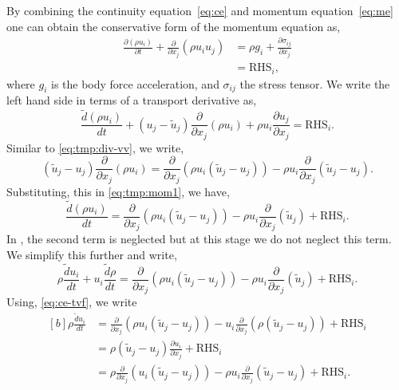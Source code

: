 \documentclass[preprint,12pt]{elsarticle}
\begin{document}
By combining the continuity equation~\eqref{eq:ce} and momentum
equation~\eqref{eq:me} one can obtain the conservative form of the momentum
equation as,
\begin{equation}
\begin{aligned}
  \label{eq:mom-eq-eulerian}
  \frac{\partial (\rho u_i)}{\partial t} +
  \frac{\partial} {\partial x_j} (\rho u_i u_j) &=
  \rho g_i + \frac{\partial \sigma_{ij}}{\partial x_j} \\
  &= \text{RHS}_i,
\end{aligned}
\end{equation}
where $g_i$ is the body force acceleration, and $\sigma_{ij}$ the stress tensor.
We write the left hand side in terms of a transport derivative as,
\begin{equation}
  \label{eq:tmp:mom1}
  \frac{\tilde{d} (\rho u_i)}{d t} +
  (u_j - \tilde{u}_j) \frac{\partial} {\partial x_j} (\rho u_i) +
  \rho u_i \frac{\partial u_j}{\partial x_j} = \text{RHS}_i.
\end{equation}
Similar to \cref{eq:tmp:div-vv}, we write,
\begin{equation}
  \label{eq:tmp:mom2}
  (\tilde{u}_j - u_j) \frac{\partial} {\partial x_j} (\rho u_i) =
  \frac{\partial}{\partial x_j} (\rho u_i (\tilde{u}_j - u_j)) - \rho u_i \frac{\partial}{\partial x_j} (\tilde{u}_j - u_j).
\end{equation}
Substituting, this in \cref{eq:tmp:mom1}, we have,
\begin{equation}
  \label{eq:tmp:mom3}
  \frac{\tilde{d} (\rho u_i)}{d t} =
  \frac{\partial}{\partial x_j} (\rho u_i (\tilde{u}_j - u_j)) - \rho u_i \frac{\partial}{\partial x_j} (\tilde{u}_j) + \text{RHS}_i.
\end{equation}
In \citet{Adami2013}, the second term is neglected but at this stage we do not
neglect this term. We simplify this further and write,
\begin{equation}
  \label{eq:tmp:mom4}
  \rho \frac{\tilde{d} u_i}{d t} + u_i \frac{\tilde{d} \rho}{d t} =
  \frac{\partial}{\partial x_j} (\rho u_i (\tilde{u}_j - u_j)) - \rho u_i \frac{\partial}{\partial x_j} (\tilde{u}_j) + \text{RHS}_i.
\end{equation}
Using, \cref{eq:ce-tvf}, we write
\begin{equation}
  \label{eq:tmp:mom5}
  \begin{aligned}[b]
    \rho \frac{\tilde{d} u_i}{d t} &= \frac{\partial}{\partial x_j} (\rho u_i
    (\tilde{u}_j - u_j)) - u_i \frac{\partial}{\partial x_j}(\rho (\tilde{u}_j
    - u_j)) + \text{RHS}_i\\
    &= \rho (\tilde{u}_j - u_j) \frac{\partial u_i}{\partial x_j} + \text{RHS}_i \\
    &= \rho \frac{\partial}{\partial x_j} (u_i (\tilde{u}_j - u_j)) -
    \rho u_i \frac{\partial}{\partial x_j} (\tilde{u}_j - u_j)
    + \text{RHS}_i.
  \end{aligned}
\end{equation}
\end{document}
